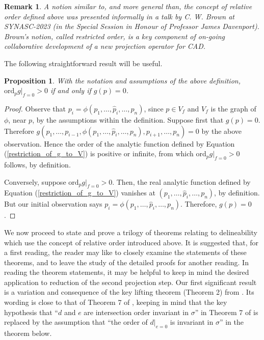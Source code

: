\documentclass{article}
\newtheorem{proposition}{Proposition}
\newtheorem{remark}{Remark}
\begin{document}
\begin{remark}
    A notion similar to, and more general than, the concept
    of relative order defined above was presented informally
    in a talk by C. W. Brown at SYNASC-2023
    (in the Special Session in Honour of Professor James Davenport).
    Brown's notion, called restricted order, is a key component
    of on-going collaborative development of a new projection
    operator for CAD.
\end{remark}

The following straightforward result will be  useful.

\begin{proposition} \label{Simple fact}
    With the notation and assumptions of the above definition,
 $\mathrm{ord}_p g|_{f=0} > 0$ if and only if $g(p) = 0$.   
\end{proposition}


\begin{proof} Observe that
$p_i = \phi(p_1, \ldots, \hat{p}_i, \ldots, p_n)$,
since $p \in V_f$ and $V_f$ is the graph of $\phi$, near $p$,
by the assumptions within the definition.
Suppose first that $g(p) = 0$.
Therefore
$g(p_1, \ldots, p_{i-1}, \phi(p_1, \ldots, \hat{p}_i, \ldots, p_n),
p_{i+1}, \ldots, p_n) = 0$ by the above observation.
Hence the order of the analytic function defined by Equation 
(\ref{restriction_of_g_to_V}) is positive or infinite,
from which $\mathrm{ord}_p g|_{f=0} > 0$ follows, by definition.

Conversely, suppose $\mathrm{ord}_p g|_{f=0} > 0$.
Then, the real analytic function defined by Equation (\ref{restriction_of_g_to_V}) vanishes at
$(p_1, \ldots, \hat{p}_i, \ldots, p_n)$, by definition.
But our initial observation says
$p_i = \phi(p_1, \ldots, \hat{p}_i, \ldots, p_n)$.
Therefore, $g(p) = 0$.
\end{proof}

We now proceed to state and prove a trilogy of 
theorems relating to delineability
which use the concept of relative order introduced above.
It is suggested that, for a first reading, the reader may like to
closely examine the statements of these theorems, and to leave the study
of the detailed proofs for another reading.
In reading the theorem statements, it may be helpful to keep in mind
the desired application to reduction of the second projection step. 
Our first significant result is a variation and consequence of the key lifting theorem (Theorem 2) from \cite{McCallum1998}.
Its wording is close to that of Theorem 7 of \cite{MNDS20},
keeping in mind that the key hypothesis that ``$d$ and $e$ are
intersection order invariant in $\sigma$'' in Theorem 7 of \cite{MNDS20}
is replaced by the assumption that ``the order of $d|_{e=0}$ is
invariant in $\sigma$'' in the theorem below.
\end{document}
